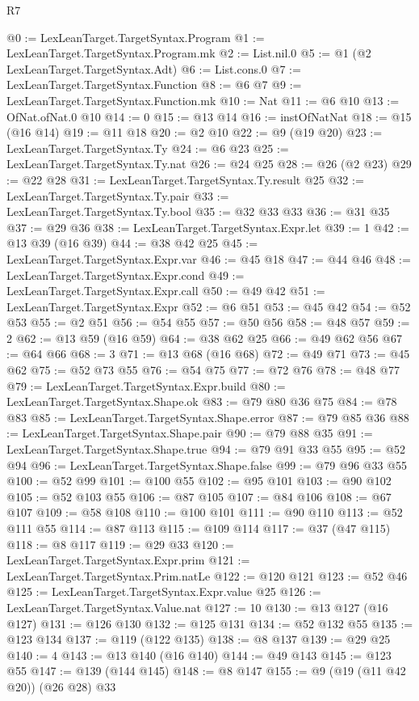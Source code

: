\begin{lexlean}{R7}
\begin{coremodule}
{{{{{{{{{{{{{@0 := LexLeanTarget.TargetSyntax.Program
@1 := LexLeanTarget.TargetSyntax.Program.mk
@2 := List.nil.{0}
@5 := @1 (@2 LexLeanTarget.TargetSyntax.Adt)
@6 := List.cons.{0}
@7 := LexLeanTarget.TargetSyntax.Function
@8 := @6 @7
@9 := LexLeanTarget.TargetSyntax.Function.mk
@10 := Nat
@11 := @6 @10
@13 := OfNat.ofNat.{0} @10
@14 := 0
@15 := @13 @14
@16 := instOfNatNat
@18 := @15 (@16 @14)
@19 := @11 @18
@20 := @2 @10
@22 := @9 (@19 @20)
@23 := LexLeanTarget.TargetSyntax.Ty
@24 := @6 @23
@25 := LexLeanTarget.TargetSyntax.Ty.nat
@26 := @24 @25
@28 := @26 (@2 @23)
@29 := @22 @28
@31 := LexLeanTarget.TargetSyntax.Ty.result @25
@32 := LexLeanTarget.TargetSyntax.Ty.pair
@33 := LexLeanTarget.TargetSyntax.Ty.bool
@35 := @32 @33 @33
@36 := @31 @35
@37 := @29 @36
@38 := LexLeanTarget.TargetSyntax.Expr.let
@39 := 1
@42 := @13 @39 (@16 @39)
@44 := @38 @42 @25
@45 := LexLeanTarget.TargetSyntax.Expr.var
@46 := @45 @18
@47 := @44 @46
@48 := LexLeanTarget.TargetSyntax.Expr.cond
@49 := LexLeanTarget.TargetSyntax.Expr.call
@50 := @49 @42
@51 := LexLeanTarget.TargetSyntax.Expr
@52 := @6 @51
@53 := @45 @42
@54 := @52 @53
@55 := @2 @51
@56 := @54 @55
@57 := @50 @56
@58 := @48 @57
@59 := 2
@62 := @13 @59 (@16 @59)
@64 := @38 @62 @25
@66 := @49 @62 @56
@67 := @64 @66
@68 := 3
@71 := @13 @68 (@16 @68)
@72 := @49 @71
@73 := @45 @62
@75 := @52 @73 @55
@76 := @54 @75
@77 := @72 @76
@78 := @48 @77
@79 := LexLeanTarget.TargetSyntax.Expr.build
@80 := LexLeanTarget.TargetSyntax.Shape.ok
@83 := @79 @80 @36 @75
@84 := @78 @83
@85 := LexLeanTarget.TargetSyntax.Shape.error
@87 := @79 @85 @36
@88 := LexLeanTarget.TargetSyntax.Shape.pair
@90 := @79 @88 @35
@91 := LexLeanTarget.TargetSyntax.Shape.true
@94 := @79 @91 @33 @55
@95 := @52 @94
@96 := LexLeanTarget.TargetSyntax.Shape.false
@99 := @79 @96 @33 @55
@100 := @52 @99
@101 := @100 @55
@102 := @95 @101
@103 := @90 @102
@105 := @52 @103 @55
@106 := @87 @105
@107 := @84 @106
@108 := @67 @107
@109 := @58 @108
@110 := @100 @101
@111 := @90 @110
@113 := @52 @111 @55
@114 := @87 @113
@115 := @109 @114
@117 := @37 (@47 @115)
@118 := @8 @117
@119 := @29 @33
@120 := LexLeanTarget.TargetSyntax.Expr.prim
@121 := LexLeanTarget.TargetSyntax.Prim.natLe
@122 := @120 @121
@123 := @52 @46
@125 := LexLeanTarget.TargetSyntax.Expr.value @25
@126 := LexLeanTarget.TargetSyntax.Value.nat
@127 := 10
@130 := @13 @127 (@16 @127)
@131 := @126 @130
@132 := @125 @131
@134 := @52 @132 @55
@135 := @123 @134
@137 := @119 (@122 @135)
@138 := @8 @137
@139 := @29 @25
@140 := 4
@143 := @13 @140 (@16 @140)
@144 := @49 @143
@145 := @123 @55
@147 := @139 (@144 @145)
@148 := @8 @147
@155 := @9 (@19 (@11 @42 @20)) (@26 @28) @33
}}}}}}}}}}}}}
\end{coremodule}
\end{lexlean}
